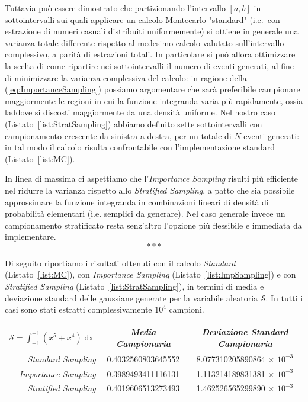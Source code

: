 \begin{description}
	Tuttavia può essere dimostrato che partizionando l'intervallo $[a,b]$ in sottointervalli sui quali applicare un calcolo Montecarlo "standard" (i.e.~con estrazione di numeri casuali distribuiti uniformemente) si ottiene in generale una varianza totale differente rispetto al medesimo calcolo valutato sull'intervallo complessivo, a parità di estrazioni totali. In particolare si può allora ottimizzare la scelta di come ripartire nei sottointervalli il numero di eventi generati, al fine di minimizzare la varianza complessiva del calcolo: in ragione della (\ref{eq:ImportanceSampling}) possiamo argomentare che sarà preferibile campionare maggiormente le regioni in cui la funzione integranda varia più rapidamente, ossia laddove si discosti maggiormente da una densità uniforme. Nel nostro caso (Listato~\ref{list:StratSampling}) abbiamo definito sette sottointervalli con campionamento crescente da sinistra a destra, per un totale di $N$ eventi generati: in tal modo il calcolo risulta confrontabile con l'implementazione standard (Listato~\ref{list:MC}).
	
\end{description}

\noindent In linea di massima ci aspettiamo che l'\textit{Importance Sampling} risulti più efficiente nel ridurre la varianza rispetto allo\textit{ Stratified Sampling}, a patto che sia possibile approssimare la funzione integranda in combinazioni lineari di densità di probabilità elementari (i.e. semplici da generare). Nel caso generale invece un campionamento stratificato resta senz'altro l'opzione più flessibile e immediata da implementare.\\

\[* * * \] \smallskip

\noindent Di seguito riportiamo i risultati ottenuti con il calcolo \textit{Standard} (Listato~\ref{list:MC}), con\textit{ Importance Sampling} (Listato~\ref{list:ImpSampling}) e con \textit{Stratified Sampling} (Listato~\ref{list:StratSampling}), in termini di media e deviazione standard delle gaussiane generate per la variabile aleatoria $\mathcal{S}$. In tutti i casi sono stati estratti complessivamente $10^4$ campioni.
 
 \bgroup
 \def\arraystretch{2}
 \begin{center}
 	\begin{tabular}{r||c|c}
 	$ \mathcal{S} = \int_{-1}^{+1}(x^5+x^4)\mathop{dx}$ & \textit{Media Campionaria} & \textit{Deviazione Standard Campionaria }\\  \hline
 		\textit{Standard Sampling }& 0.4032560803645552  & 8.077310205890864 $\times \,\,10^{-3}$\\ 
 		\textit{Importance Sampling} & 0.3989493411116131 & 1.113214189831381 $\times\,\, 10^{-3}$\\ 
 		\textit{Stratified Sampling} & 0.4019606513273493 & 1.462526565299890 $\times \,\,10^{-3}$\\
 	\end{tabular}
 \end{center}
 \egroup
 

